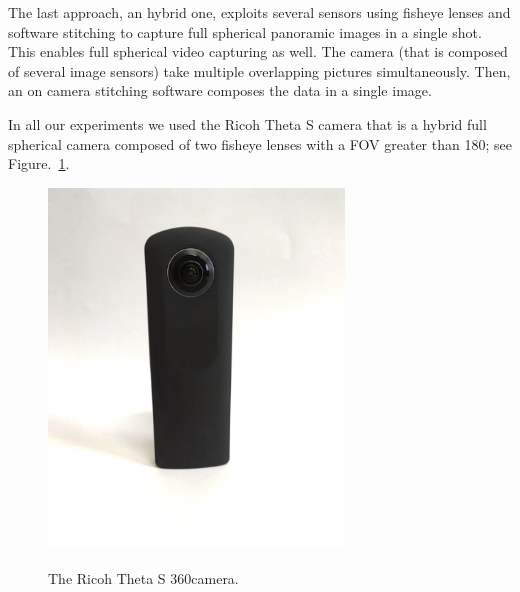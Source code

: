 The last approach, an hybrid one, exploits several sensors using fisheye lenses and software stitching to capture full spherical panoramic images in a single shot. This enables full spherical video capturing as well. The camera (that is composed of several image sensors) take multiple overlapping pictures simultaneously. Then, an on camera stitching software composes the data in a single image.

In all our experiments we used the Ricoh Theta S camera that is a hybrid full spherical camera 
composed of two fisheye lenses with a FOV greater than 180\degree; see Figure.~\ref{fig:ricoh_theta}.

\begin{figure}
\centering
\includegraphics[width=0.7\textwidth]{img/theta1}
\label{fig:ricoh_theta}
\caption{The Ricoh Theta S 360\degree camera.}
\end{figure}
